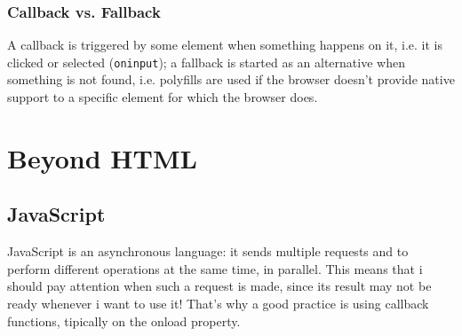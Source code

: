 \documentclass[a4paper,11pt]{book}
\begin{document}
    \section{Callback vs. Fallback}
    A callback is triggered by some element when something happens on it, i.e. it is clicked or selected (\texttt{oninput});
    a fallback is started as an alternative when something is not found, i.e. polyfills are used if the
    browser doesn't provide native support to a specific element for which the browser does.

\part{Beyond HTML}

\chapter{JavaScript}
JavaScript is an asynchronous language: it sends multiple requests and to perform different operations at the same time,
in parallel. This means that i should pay attention when such a request is made, since its result may not be ready
whenever i want to use it! That's why a good practice is using callback functions, tipically on the onload property.
\end{document}
